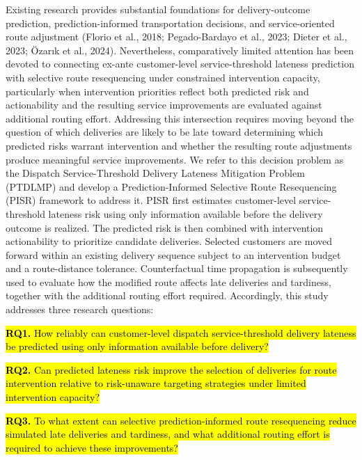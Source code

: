 \documentclass[11pt,a4paper]{article}
\begin{document}
Existing research provides substantial foundations for delivery-outcome
prediction, prediction-informed transportation decisions, and
service-oriented route adjustment (Florio et al., 2018; Pegado-Bardayo
et al., 2023; Dieter et al., 2023; Özarık et al., 2024). Nevertheless,
comparatively limited attention has been devoted to connecting ex-ante
customer-level service-threshold lateness prediction with selective route
resequencing under constrained intervention capacity, particularly when
intervention priorities reflect both predicted risk and actionability
and the resulting service improvements are evaluated against additional
routing effort. Addressing this intersection requires moving beyond the
question of which deliveries are likely to be late toward determining
which predicted risks warrant intervention and whether the resulting
route adjustments produce meaningful service improvements. We refer to
this decision problem as the Dispatch Service-Threshold Delivery Lateness Mitigation
Problem (PTDLMP) and develop a Prediction-Informed Selective Route
Resequencing (PISR) framework to address it. PISR first estimates
customer-level service-threshold lateness risk using only information
available before the delivery outcome is realized. The predicted risk is
then combined with intervention actionability to prioritize candidate
deliveries. Selected customers are moved forward within an existing
delivery sequence subject to an intervention budget and a route-distance
tolerance. Counterfactual time propagation is subsequently used to
evaluate how the modified route affects late deliveries and tardiness,
together with the additional routing effort required. Accordingly, this
study addresses three research questions:

\hl{\textbf{RQ1.} How reliably can customer-level dispatch service-threshold delivery
lateness be predicted using only information available before delivery?}

\hl{\textbf{RQ2.} Can predicted lateness risk improve the selection of
deliveries for route intervention relative to risk-unaware targeting
strategies under limited intervention capacity?}

\hl{\textbf{RQ3.} To what extent can selective prediction-informed route
resequencing reduce simulated late deliveries and tardiness, and what
additional routing effort is required to achieve these improvements?}
\end{document}
